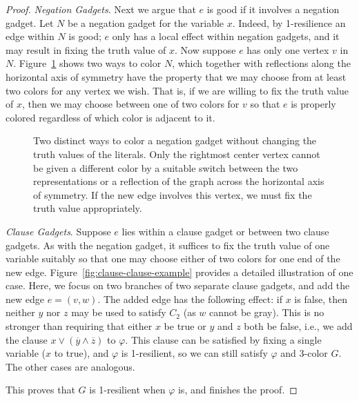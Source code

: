 \begin{proof}
\emph{Negation Gadgets}. Next we argue that $e$ is good if it involves a
negation gadget. Let $N$ be a negation gadget for the variable $x$. Indeed, by
1-resilience an edge within $N$ is good; $e$ only has a local effect within
negation gadgets, and it may result in fixing the truth value of $x$. Now
suppose $e$ has only one vertex $v$ in $N$. Figure~\ref{fig:coloring-negation}
shows two ways to color $N$, which together with reflections along the
horizontal axis of symmetry have the property that we may choose from at least
two colors for any vertex we wish. That is, if we are willing to fix the truth
value of $x$, then we may choose between one of two colors for $v$ so that $e$
is properly colored regardless of which color is adjacent to it.  

\begin{figure}
\centering
{}
\caption{Two distinct ways to color a negation gadget without changing the
truth values of the literals. Only the rightmost center vertex cannot be given
a different color by a suitable switch between the two representations or a
reflection of the graph across the horizontal axis of symmetry. If the new edge
involves this vertex, we must fix the truth value appropriately.}
\label{fig:coloring-negation} 
\end{figure}

\emph{Clause Gadgets}. Suppose $e$ lies within a clause gadget or between two
clause gadgets. As with the negation gadget, it suffices to fix the truth value
of one variable suitably so that one may choose either of two colors for one
end of the new edge. Figure~\ref{fig:clause-clause-example} provides a detailed
illustration of one case. Here, we focus on two branches of two separate clause
gadgets, and add the new edge $e = (v,w)$. The added edge has the following
effect: if $x$ is false, then neither $y$ nor $z$ may be used to satisfy $C_2$
(as $w$ cannot be gray). This is no stronger than requiring that either $x$ be
true or $y$ and $z$ both be false, i.e., we add the clause $x \vee
(\overline{y} \wedge \overline{z})$ to $\varphi$. This clause can be satisfied
by fixing a single variable ($x$ to true), and $\varphi$ is 1-resilient, so we
can still satisfy $\varphi$ and 3-color $G$.  The other cases are analogous.

This proves that $G$ is 1-resilient when $\varphi$ is, and finishes the proof.
\end{proof}

